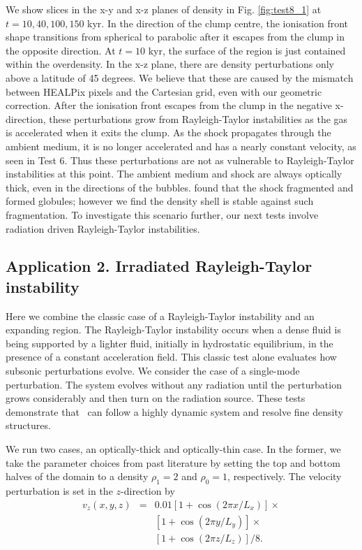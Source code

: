 \documentclass[useAMS,usenatbib]{mn2e}
\begin{document}
We show slices in the x-y and x-z planes of density in Fig.
\ref{fig:test8_1} at $t = 10, 40, 100, 150$ kyr.  In the direction of
the clump centre, the ionisation front shape transitions from
spherical to parabolic after it escapes from the clump in the opposite
direction.  At $t = 10$ kyr, the surface of the \hii region is
just contained within the overdensity.  In the x-z plane, there are
density perturbations only above a latitude of 45 degrees.  We believe
that these are caused by the mismatch between HEALPix pixels and the
Cartesian grid, even with our geometric correction.  After the
ionisation front escapes from the clump in the negative x-direction,
these perturbations grow from Rayleigh-Taylor instabilities as the gas
is accelerated when it exits the clump.  As the shock propagates
through the ambient medium, it is no longer accelerated and has a
nearly constant velocity, as seen in Test 6.  Thus these perturbations
are not as vulnerable to Rayleigh-Taylor instabilities at this point.
The ambient medium and shock are always optically thick, even in the
directions of the bubbles.  \citeauthor{Bisbas09} found that the shock
fragmented and formed globules; however we find the density shell is
stable against such fragmentation.  To investigate this scenario
further, our next tests involve radiation driven Rayleigh-Taylor
instabilities.

\subsection{Application 2. Irradiated Rayleigh-Taylor instability}

Here we combine the classic case of a Rayleigh-Taylor instability and
an expanding \hii region.  The Rayleigh-Taylor instability
occurs when a dense fluid is being supported by a lighter fluid,
initially in hydrostatic equilibrium, in the presence of a constant
acceleration field.  This classic test alone evaluates how subsonic
perturbations evolve.  We consider the case of a single-mode
perturbation.  The system evolves without any radiation until the
perturbation grows considerably and then turn on the radiation source.
These tests demonstrate that \moray~can follow a highly dynamic
system and resolve fine density structures.

We run two cases, an optically-thick and optically-thin case.  In
the former, we take the parameter choices from past literature
\citep[e.g.][]{Liska03, Stone08} by setting the top and bottom halves
of the domain to a density $\rho_1 = 2$ and $\rho_0 = 1$,
respectively.  The velocity perturbation is set in the $z$-direction
by
\begin{eqnarray}
  v_z(x,y,z) & = & 0.01 [1 + \cos(2\pi x / L_x)] \times  \nonumber\\
  & & [1 + \cos(2\pi y / L_y)] \times \nonumber\\
  & & [1 + \cos(2\pi z / L_z)]/8.
\end{eqnarray}
\end{document}
